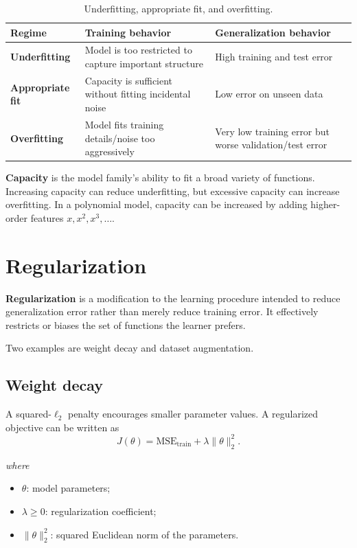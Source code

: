 \documentclass[11pt,a4paper]{report}
\newcommand{\wherelegend}{\par\smallskip\textit{where}\vspace{-0.3em}}
\begin{document}
\begin{table}[H]
\centering
\caption{Underfitting, appropriate fit, and overfitting.}
\label{tab:fitting}
\begin{tabularx}{\textwidth}{>{\bfseries}p{}X X}
\toprule
\rowcolor{Primary}
\color{white}Regime & \color{white}Training behavior & \color{white}Generalization behavior \\
\midrule
Underfitting & Model is too restricted to capture important structure & High training and test error \\
Appropriate fit & Capacity is sufficient without fitting incidental noise & Low error on unseen data \\
Overfitting & Model fits training details/noise too aggressively & Very low training error but worse validation/test error \\
\bottomrule
\end{tabularx}
\end{table}

\textbf{Capacity} is the model family's ability to fit a broad variety of functions. Increasing capacity can reduce underfitting, but excessive capacity can increase overfitting. In a polynomial model, capacity can be increased by adding higher-order features $x,x^2,x^3,\ldots$.

\section{Regularization}

\begin{definitionbox}
\textbf{Regularization} is a modification to the learning procedure intended to reduce generalization error rather than merely reduce training error. It effectively restricts or biases the set of functions the learner prefers.
\end{definitionbox}

Two examples are weight decay and dataset augmentation.

\subsection{Weight decay}

A squared-$\ell_2$ penalty encourages smaller parameter values. A regularized objective can be written as
\begin{equation}
  J(\theta)=\mathrm{MSE}_{\mathrm{train}} + \lambda\lVert\theta\rVert_2^2.
  \label{eq:weight-decay-source}
\end{equation}
\wherelegend
\begin{itemize}
  \item $\theta$: model parameters;
  \item $\lambda\ge 0$: regularization coefficient;
  \item $\lVert\theta\rVert_2^2$: squared Euclidean norm of the parameters.
\end{itemize}
\end{document}
